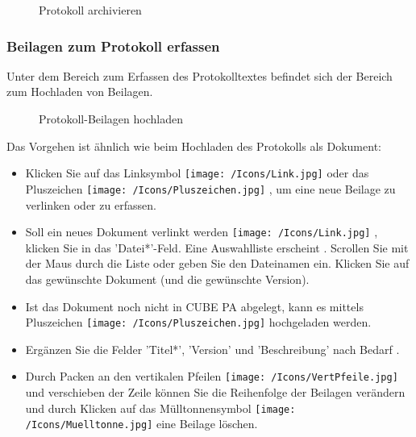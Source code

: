 \begin{figure}[H]
\caption{Protokoll archivieren}
\end{figure}

\subsubsection{Beilagen zum Protokoll erfassen}

Unter dem Bereich zum Erfassen des Protokolltextes befindet sich der Bereich zum Hochladen von Beilagen.

\begin{figure}[H]
\caption{Protokoll-Beilagen hochladen}
\end{figure}

Das Vorgehen ist ähnlich wie beim Hochladen des Protokolls als Dokument:

\begin{itemize}
\item
Klicken Sie auf das Linksymbol \texttt{[image: /Icons/Link.jpg]} oder das Pluszeichen \texttt{[image: /Icons/Pluszeichen.jpg]} , um eine neue Beilage zu verlinken oder zu erfassen.
\item
Soll ein neues Dokument verlinkt werden \texttt{[image: /Icons/Link.jpg]} , klicken Sie in das 'Datei*'-Feld. Eine Auswahlliste erscheint . Scrollen Sie mit der Maus durch die Liste oder geben Sie den Dateinamen ein. Klicken Sie auf das gewünschte Dokument (und die gewünschte Version).
\item
Ist das Dokument noch nicht in CUBE PA abgelegt, kann es mittels Pluszeichen \texttt{[image: /Icons/Pluszeichen.jpg]}  hochgeladen werden.
\item
Ergänzen Sie die Felder 'Titel*', 'Version' und 'Beschreibung' nach Bedarf .
\item
Durch Packen an den vertikalen Pfeilen \texttt{[image: /Icons/VertPfeile.jpg]}  und verschieben der Zeile können Sie die Reihenfolge der Beilagen verändern und durch Klicken auf das Mülltonnensymbol \texttt{[image: /Icons/Muelltonne.jpg]}  eine Beilage löschen.
\end{itemize}


